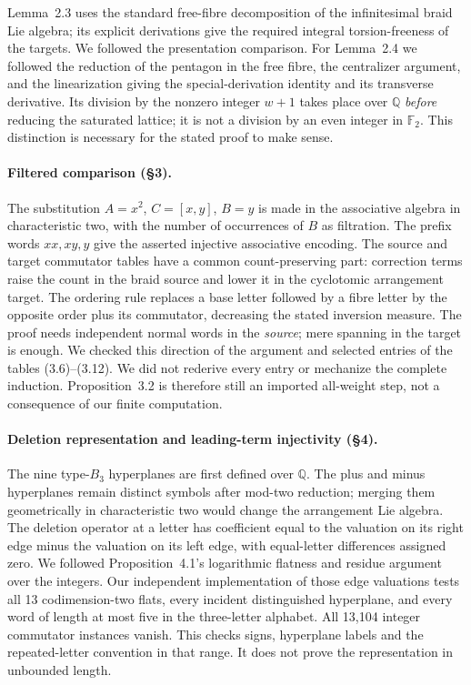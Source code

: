 Lemma~2.3 uses the standard free-fibre decomposition of the
infinitesimal braid Lie algebra; its explicit derivations give the
required integral torsion-freeness of the targets.  We followed the
presentation comparison.  For Lemma~2.4 we followed the reduction of
the pentagon in the free fibre, the centralizer argument, and the
linearization giving the special-derivation identity and its transverse
derivative.  Its division by the nonzero integer $w+1$ takes place
over $\mathbb Q$ \emph{before} reducing the saturated lattice; it is
not a division by an even integer in $\mathbb F_2$.  This distinction
is necessary for the stated proof to make sense.

\paragraph{Filtered comparison (\S3).}
The substitution
$A=x^2$, $C=[x,y]$, $B=y$ is made in the associative algebra in
characteristic two, with the number of occurrences of $B$ as filtration.
The prefix words $xx,xy,y$ give the asserted injective associative
encoding.  The source and target commutator tables have a common
count-preserving part: correction terms raise the count in the braid
source and lower it in the cyclotomic arrangement target.  The ordering
rule replaces a base letter followed by a fibre letter by the opposite
order plus its commutator, decreasing the stated inversion measure.
The proof needs independent normal words in the \emph{source}; mere
spanning in the target is enough.  We checked this direction of the
argument and selected entries of the tables (3.6)--(3.12).  We did not
rederive every entry or mechanize the complete induction.  Proposition~3.2
is therefore still an imported all-weight step, not a consequence of
our finite computation.

\paragraph{Deletion representation and leading-term injectivity (\S4).}
The nine type-$B_3$ hyperplanes are first defined over $\mathbb Q$.
The plus and minus hyperplanes remain distinct symbols after mod-two
reduction; merging them geometrically in characteristic two would change
the arrangement Lie algebra.  The deletion operator at a letter has
coefficient equal to the valuation on its right edge minus the
valuation on its left edge, with equal-letter differences assigned zero.
We followed Proposition~4.1's logarithmic flatness and residue argument
over the integers.  Our independent implementation of those edge
valuations tests all 13 codimension-two flats, every incident distinguished
hyperplane, and every word of length at most five in the three-letter
alphabet.  All 13,104 integer commutator instances vanish.
This checks signs, hyperplane labels and the repeated-letter convention
in that range.  It does not prove the representation in unbounded length.


